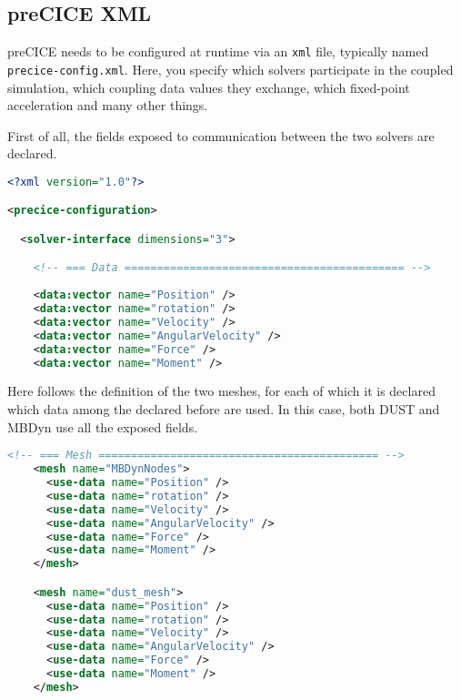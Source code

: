 \subsection{preCICE XML}
preCICE needs to be configured at runtime via an \texttt{xml} file, typically named \texttt{precice-config.xml}. Here, you specify which solvers participate in the coupled simulation, which coupling data values they exchange, which fixed-point acceleration and many other things.

First of all, the fields exposed to communication between the two solvers are declared.
\begin{lstlisting}[language=XML]
<?xml version="1.0"?>

<precice-configuration>

  <solver-interface dimensions="3">

    <!-- === Data =========================================== -->
    
    <data:vector name="Position" />
    <data:vector name="rotation" />
    <data:vector name="Velocity" />
    <data:vector name="AngularVelocity" />
    <data:vector name="Force" />
    <data:vector name="Moment" />
\end{lstlisting}  

Here follows the definition of the two meshes, for each of which it is declared which data among the declared before are used.
In this case, both DUST and MBDyn use all the exposed fields.
\begin{lstlisting}[language=XML]
    <!-- === Mesh =========================================== -->
    <mesh name="MBDynNodes">
      <use-data name="Position" />
      <use-data name="rotation" />
      <use-data name="Velocity" />
      <use-data name="AngularVelocity" />
      <use-data name="Force" />
      <use-data name="Moment" />
    </mesh>

    <mesh name="dust_mesh">
      <use-data name="Position" />
      <use-data name="rotation" />
      <use-data name="Velocity" />
      <use-data name="AngularVelocity" />
      <use-data name="Force" />
      <use-data name="Moment" />
    </mesh>
\end{lstlisting} 

